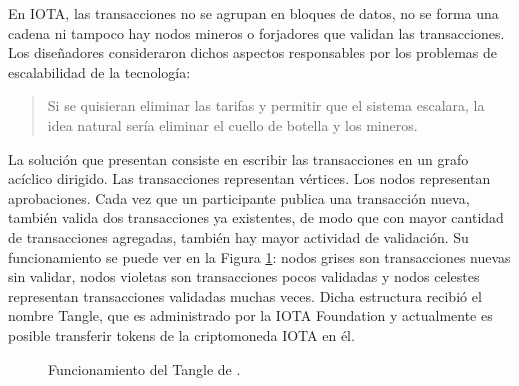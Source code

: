 En IOTA, las transacciones no se agrupan en bloques de datos, no se forma una cadena ni tampoco hay nodos mineros o forjadores que validan las transacciones. Los diseñadores consideraron dichos aspectos responsables por los problemas de escalabilidad de la tecnología:
\begin{quote}
Si se quisieran eliminar las tarifas y permitir que el sistema escalara, la idea natural sería eliminar el cuello de botella y los mineros.\cite{iota_article}
\end{quote}
La solución que presentan consiste en escribir las transacciones en un grafo acíclico dirigido.
Las transacciones representan vértices. Los nodos representan aprobaciones. Cada vez que un participante publica una transacción nueva, también valida dos transacciones ya existentes, de modo que con mayor cantidad de transacciones agregadas, también hay mayor actividad de validación. Su funcionamiento se puede ver en la Figura \ref{fig:Selection_039}: nodos grises son transacciones nuevas sin validar, nodos violetas son transacciones pocos validadas y nodos celestes representan transacciones validadas muchas veces. Dicha estructura recibió el nombre Tangle, que es administrado por la IOTA Foundation y actualmente es posible transferir tokens de la criptomoneda IOTA en él.

\begin{figure}[h] %
\caption{Funcionamiento del Tangle de \cite{tangle_picture}.}
\label{fig:Selection_039}
\end{figure}

